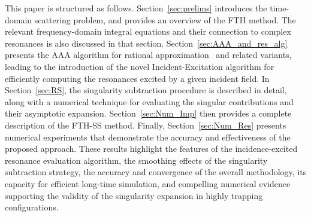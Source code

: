 \documentclass[11pt]{article}
\theoremstyle{plain}
\theoremstyle{remark}
\begin{document}
This paper is structured as follows. Section~\ref{sec:prelims}
introduces the time-domain scattering problem, and provides an
overview of the FTH method. The relevant frequency-domain integral
equations and their connection to complex resonances is also discussed
in that section. Section~\ref{sec:AAA_and_res_alg} presents the AAA
algorithm for rational approximation~\cite{AAA} and related variants,
leading to the introduction of the novel Incident-Excitation algorithm
for efficiently computing the resonances excited by a given incident
field. In Section~\ref{sec:RS}, the singularity subtraction procedure
is described in detail, along with a numerical technique for
evaluating the singular contributions and their asymptotic
expansion. Section~\ref{sec:Num_Imp} then provides a complete
description of the FTH-SS method. Finally, Section~\ref{sec:Num_Res}
presents numerical experiments that demonstrate the accuracy and
effectiveness of the proposed approach. These results highlight the
features of the incidence-excited resonance evaluation algorithm, the
smoothing effects of the singularity subtraction strategy, the
accuracy and convergence of the overall methodology, its capacity for
efficient long-time simulation, and compelling numerical evidence
supporting the validity of the singularity expansion in highly
trapping configurations.


\end{document}
